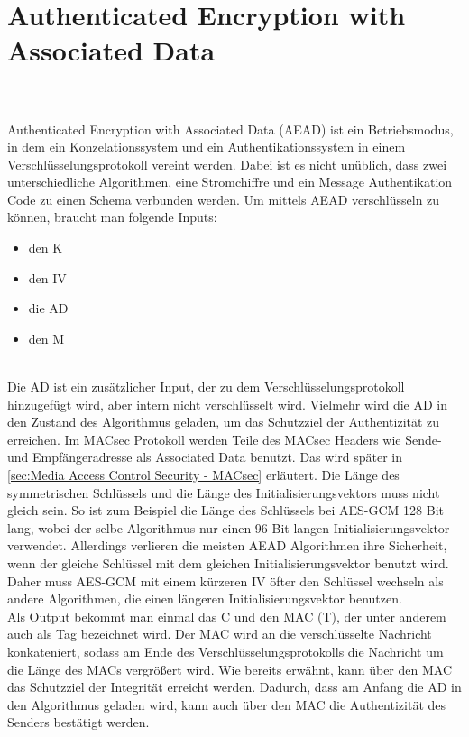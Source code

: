 \section{Authenticated Encryption with Associated Data}
\label{sec:Authenticated Encryption with Associated Data}
\\
\\
Authenticated Encryption with Associated Data (\gls{AEAD}) ist ein  Betriebsmodus, in dem ein Konzelationssystem und ein Authentikationssystem in einem Verschlüsselungsprotokoll vereint werden. Dabei ist es nicht unüblich, dass zwei unterschiedliche Algorithmen, eine Stromchiffre und ein Message Authentikation Code zu einen Schema verbunden werden.  
Um mittels \gls{AEAD} verschlüsseln zu können, braucht man folgende Inputs:
\begin{itemize}
\item den \gls{K}
\item den \gls{IV}
\item die \gls{AD}
\item den \gls{M}
\end{itemize} \\
Die \gls{AD} ist ein zusätzlicher Input, der zu dem Verschlüsselungsprotokoll hinzugefügt wird, aber intern nicht verschlüsselt wird. Vielmehr wird die \gls{AD} in den Zustand des Algorithmus geladen, um das Schutzziel der Authentizität zu erreichen. Im \gls{MACsec} Protokoll werden Teile des \gls{MACsec} Headers wie Sende- und Empfängeradresse als Associated Data benutzt. Das wird später in \ref{sec:Media Access Control Security - MACsec} erläutert. Die Länge des symmetrischen Schlüssels und die Länge des Initialisierungsvektors muss nicht gleich sein. So ist zum Beispiel die Länge des Schlüssels bei \gls{AES-GCM} 128 Bit lang, wobei der selbe Algorithmus nur einen 96 Bit langen Initialisierungsvektor verwendet. Allerdings verlieren die meisten \gls{AEAD} Algorithmen ihre Sicherheit, wenn der gleiche Schlüssel mit dem gleichen Initialisierungsvektor benutzt wird. Daher muss \gls{AES-GCM} mit einem kürzeren \gls{IV} öfter den Schlüssel wechseln als andere Algorithmen, die einen längeren Initialisierungsvektor benutzen. \\
Als Output bekommt man einmal das \gls{C} und den MAC (T), der unter anderem auch als Tag bezeichnet wird. Der MAC wird an die verschlüsselte Nachricht konkateniert, sodass am Ende des Verschlüsselungsprotokolls die Nachricht um die Länge des MACs vergrößert wird. Wie bereits erwähnt, kann über den MAC das Schutzziel der Integrität erreicht werden. Dadurch, dass am Anfang die \gls{AD} in den Algorithmus geladen wird, kann auch über den MAC die Authentizität des Senders bestätigt werden.\\

